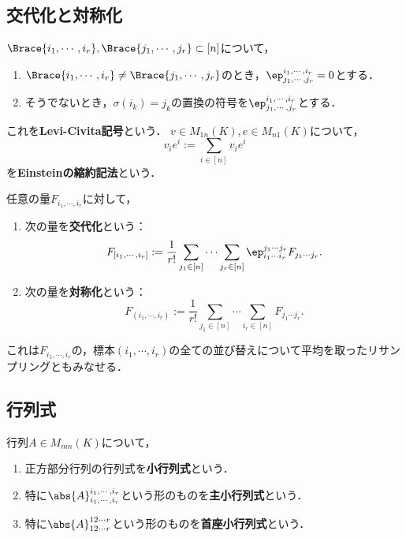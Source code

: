 \documentclass[uplatex, dvipdfmx]{jsreport}
\begin{document}
\subsection{交代化と対称化}

\begin{notation}
    $\Brace{i_1,\cdots,i_r},\Brace{j_1,\cdots,j_r}\subset[n]$について，
    \begin{enumerate}
        \item $\Brace{i_1,\cdots,i_r}\ne\Brace{j_1,\cdots,j_r}$のとき，$\ep^{i_1,\cdots,i_r}_{j_1,\cdots,j_r}=0$とする．
        \item そうでないとき，$\sigma(i_k)=j_k$の置換の符号を$\ep^{i_1,\cdots,i_r}_{j_1,\cdots,j_r}$とする．
    \end{enumerate}
    これを\textbf{Levi-Civita記号}という．
    $v\in M_{1n}(K),e\in M_{n1}(K)$について，
    \[v_ie^i:=\sum_{i\in[n]}v_ie^i\]
    を\textbf{Einsteinの縮約記法}という．
\end{notation}

\begin{definition}
    任意の量$F_{i_1,\cdots,i_r}$に対して，
    \begin{enumerate}
        \item 次の量を\textbf{交代化}という：
        \[F_{[i_1,\cdots,i_r]}:=\frac{1}{r!}\sum_{j_1\in[n]}\cdots\sum_{j_r\in[n]}\ep^{j_1\cdots j_r}_{i_1\cdots i_r}F_{j_1\cdots j_r}.\]
        \item 次の量を\textbf{対称化}という：
        \[F_{(i_1,\cdots,i_r)}:=\frac{1}{r!}\sum_{j_1\in[n]}\cdots\sum_{i_r\in[n]}F_{j_1\cdots j_r}.\]
    \end{enumerate}
\end{definition}
\begin{remarks}
    これは$F_{i_1,\cdots,i_r}$の，標本$(i_1,\cdots,i_r)$の全ての並び替えについて平均を取ったリサンプリングともみなせる．
\end{remarks}

\subsection{行列式}

\begin{definition}
    行列$A\in M_{mn}(K)$について，
    \begin{enumerate}
        \item 正方部分行列の行列式を\textbf{小行列式}という．
        \item 特に$\abs{A}^{i_1,\cdots,i_r}_{i_1,\cdots,i_r}$という形のものを\textbf{主小行列式}という．
        \item 特に$\abs{A}^{12\cdots r}_{12\cdots r}$という形のものを\textbf{首座小行列式}という．
    \end{enumerate}
\end{definition}
\end{document}
